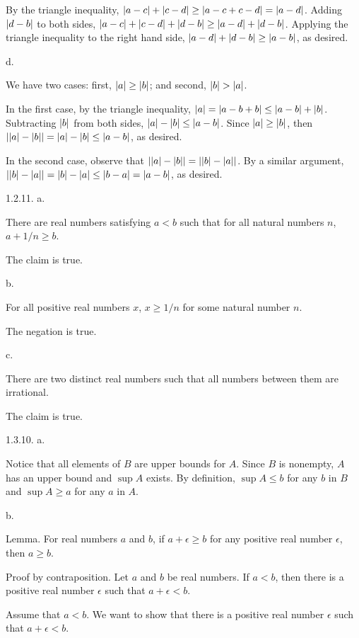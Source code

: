 By the triangle inequality,
$\vert a - c\vert + \vert c - d\vert \ge \vert a - c + c - d\vert = \vert a - d\vert$.
Adding $\vert d - b\vert$ to both sides,
$\vert a - c\vert + \vert c - d\vert + \vert d - b\vert \ge \vert a - d\vert + \vert d - b\vert$.
Applying the triangle inequality to the right hand side,
$\vert a - d\vert + \vert d - b\vert \ge \vert a - b\vert$, as desired.
\medskip
\item{} d.

We have two cases: first, $\vert a\vert \ge \vert b\vert$; and second, $\vert b\vert > \vert a\vert$.

In the first case, by the triangle inequality,
$\vert a\vert = \vert a - b + b\vert \le \vert a - b\vert + \vert b\vert$.
Subtracting $\vert b\vert$ from both sides,
$\vert a\vert - \vert b\vert \le \vert a - b\vert$.
Since $\vert a\vert \ge \vert b\vert$,
then $\vert\vert a\vert - \vert b\vert\vert = \vert a\vert - \vert b\vert \le \vert a - b\vert$, as desired.

In the second case, observe that
$\vert\vert a\vert - \vert b\vert\vert = \vert\vert b\vert - \vert a\vert\vert$.
By a similar argument,
$\vert\vert b\vert - \vert a\vert\vert = \vert b\vert - \vert a\vert \le \vert b - a\vert = \vert a - b\vert$,
as desired.
\bigskip
\item{1.2.11.} a.

There are real numbers satisfying $a < b$ such that
for all natural numbers $n$, $a + 1/n \ge b$.

The claim is true.
\medskip
\item{} b.

For all positive real numbers $x$, $x \ge 1/n$ for some natural number $n$.

The negation is true.
\medskip
\item{} c.

There are two distinct real numbers such that
all numbers between them are irrational.

The claim is true.
\bigskip
\item{1.3.10.} a.

Notice that all elements of $B$ are upper bounds for $A$.
Since $B$ is nonempty, $A$ has an upper bound and $\sup A$ exists.
By definition, $\sup A \le b$ for any $b$ in $B$
and $\sup A \ge a$ for any $a$ in $A$.
\medskip
\item{} b.

Lemma. For real numbers $a$ and $b$,
if $a + \epsilon \ge b$ for any positive real number $\epsilon$,
then $a \ge b$.

Proof by contraposition.
Let $a$ and $b$ be real numbers.
If $a < b$, then there is a positive real number $\epsilon$
such that $a + \epsilon < b$.

Assume that $a < b$.
We want to show that there is a positive real number $\epsilon$
such that $a + \epsilon < b$.

